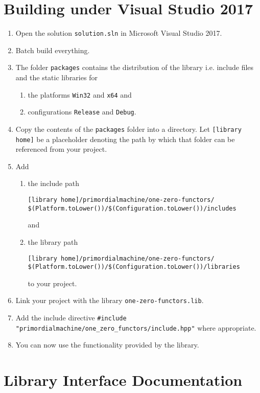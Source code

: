 \documentclass[oneside]{article}
\begin{document}
\section{Building under Visual Studio 2017}
\begin{enumerate}
\item Open the solution \texttt{solution.sln} in Microsoft Visual Studio 2017.
\item Batch build everything.
\item The folder \texttt{packages} contains the distribution of the library i.e. include files and the
      static libraries for
  \begin{enumerate}
    \item the platforms \texttt{Win32} and \texttt{x64} and
    \item configurations \texttt{Release} and \texttt{Debug}.
  \end{enumerate}
\item Copy the contents of the \verb+packages+ folder into a directory. Let
      \verb+[library home]+ be a placeholder denoting the path by which that folder
      can be referenced from your project.
\item Add
  \begin{enumerate}
    \item the include path
\begin{verbatim}
[library home]/primordialmachine/one-zero-functors/
$(Platform.toLower())/$(Configuration.toLower())/includes
\end{verbatim}
	and
    \item the library path
\begin{verbatim}
[library home]/primordialmachine/one-zero-functors/
$(Platform.toLower())/$(Configuration.toLower())/libraries
\end{verbatim}
    to your project.
\end{enumerate}
\item Link your project with the library \verb+one-zero-functors.lib+.
\item Add the include directive \verb+#include "primordialmachine/one_zero_functors/include.hpp"+ where appropriate.
\item You can now use the functionality provided by the library.
\end{enumerate}

\section{Library Interface Documentation}
\end{document}
